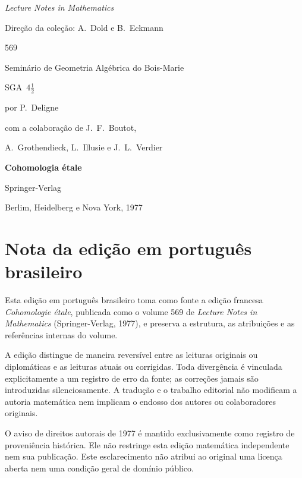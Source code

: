 
\begin{titlepage}
\centering
{\Large \textit{Lecture Notes in Mathematics}\par}
\vspace{0.8em}
{\large Direção da coleção: A.~Dold e B.~Eckmann\par}
\vspace{1.2em}
{\LARGE 569\par}
\vfill
{\Large Seminário de Geometria Algébrica do Bois-Marie\par}
\vspace{0.35em}
{\Large SGA~$4\frac{1}{2}$\par}
\vspace{1em}
{\large por P.~Deligne\par}
\vspace{0.35em}
{\large com a colaboração de J.~F.~Boutot,\par
A.~Grothendieck, L.~Illusie e J.~L.~Verdier\par}
\vfill
{\Huge\bfseries Cohomologia étale\par}
\vfill
{\Large Springer-Verlag\par}
{\large Berlim, Heidelberg e Nova York, 1977\par}
\end{titlepage}

\chapter*{Nota da edição em português brasileiro}

Esta edição em português brasileiro toma como fonte a edição francesa
\emph{Cohomologie étale}, publicada como o volume 569 de
\emph{Lecture Notes in Mathematics} (Springer-Verlag, 1977), e preserva a
estrutura, as atribuições e as referências internas do volume.

A edição distingue de maneira reversível entre as leituras originais ou
diplomáticas e as leituras atuais ou corrigidas. Toda divergência é vinculada
explicitamente a um registro de erro da fonte; as correções jamais são
introduzidas silenciosamente. A tradução e o trabalho editorial não modificam
a autoria matemática nem implicam o endosso dos autores ou colaboradores
originais.

O aviso de direitos autorais de 1977 é mantido exclusivamente como registro de
proveniência histórica. Ele não restringe esta edição matemática independente
nem sua publicação. Este esclarecimento não atribui ao original uma licença
aberta nem uma condição geral de domínio público.
